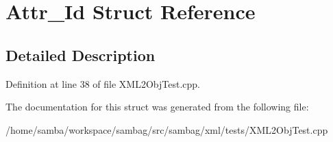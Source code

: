 \hypertarget{struct_attr___id}{
\section{Attr\_\-Id Struct Reference}
\label{struct_attr___id}
}


\subsection{Detailed Description}


Definition at line 38 of file XML2ObjTest.cpp.



The documentation for this struct was generated from the following file:\begin{DoxyCompactItemize}
\item 
/home/samba/workspace/sambag/src/sambag/xml/tests/XML2ObjTest.cpp\end{DoxyCompactItemize}
